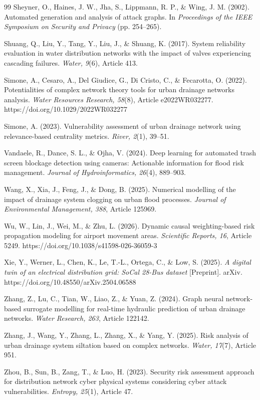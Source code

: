 \begin{thebibliography}{99}
Sheyner, O., Haines, J. W., Jha, S., Lippmann, R. P., \& Wing, J. M. (2002). Automated generation and analysis of attack graphs. In \textit{Proceedings of the IEEE Symposium on Security and Privacy} (pp. 254--265).

Shuang, Q., Liu, Y., Tang, Y., Liu, J., \& Shuang, K. (2017). System reliability evaluation in water distribution networks with the impact of valves experiencing cascading failures. \textit{Water, 9}(6), Article 413.

Simone, A., Cesaro, A., Del Giudice, G., Di Cristo, C., \& Fecarotta, O. (2022). Potentialities of complex network theory tools for urban drainage networks analysis. \textit{Water Resources Research, 58}(8), Article e2022WR032277. https://doi.org/10.1029/2022WR032277

Simone, A. (2023). Vulnerability assessment of urban drainage network using relevance-based centrality metrics. \textit{River, 2}(1), 39--51.

Vandaele, R., Dance, S. L., \& Ojha, V. (2024). Deep learning for automated trash screen blockage detection using cameras: Actionable information for flood risk management. \textit{Journal of Hydroinformatics, 26}(4), 889--903.

Wang, X., Xia, J., Feng, J., \& Dong, B. (2025). Numerical modelling of the impact of drainage system clogging on urban flood processes. \textit{Journal of Environmental Management, 388}, Article 125969.

Wu, W., Lin, J., Wei, M., \& Zhu, L. (2026). Dynamic causal weighting-based risk propagation modeling for airport movement areas. \textit{Scientific Reports, 16}, Article 5249. https://doi.org/10.1038/s41598-026-36059-3

Xie, Y., Werner, L., Chen, K., Le, T.-L., Ortega, C., \& Low, S. (2025). \textit{A digital twin of an electrical distribution grid: SoCal 28-Bus dataset} [Preprint]. arXiv. https://doi.org/10.48550/arXiv.2504.06588

Zhang, Z., Lu, C., Tian, W., Liao, Z., \& Yuan, Z. (2024). Graph neural network-based surrogate modelling for real-time hydraulic prediction of urban drainage networks. \textit{Water Research, 263}, Article 122142.

Zhang, J., Wang, Y., Zhang, L., Zhang, X., \& Yang, Y. (2025). Risk analysis of urban drainage system siltation based on complex networks. \textit{Water, 17}(7), Article 951.

Zhou, B., Sun, B., Zang, T., \& Luo, H. (2023). Security risk assessment approach for distribution network cyber physical systems considering cyber attack vulnerabilities. \textit{Entropy, 25}(1), Article 47.

\end{thebibliography}

